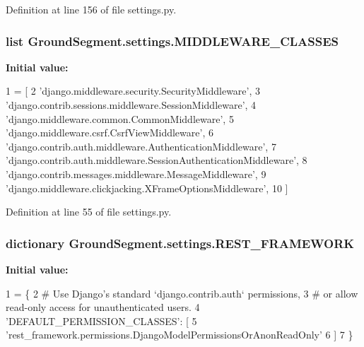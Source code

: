 Definition at line 156 of file settings.\+py.

\hypertarget{namespace_ground_segment_1_1settings_abd392b70ea7895ec177a28651e7616c8}{}
\subsubsection[{M\+I\+D\+D\+L\+E\+W\+A\+R\+E\+\_\+\+C\+L\+A\+S\+S\+E\+S}]{\setlength{\rightskip}{0pt plus 5cm}list Ground\+Segment.\+settings.\+M\+I\+D\+D\+L\+E\+W\+A\+R\+E\+\_\+\+C\+L\+A\+S\+S\+E\+S}\label{namespace_ground_segment_1_1settings_abd392b70ea7895ec177a28651e7616c8}
{\bfseries Initial value\+:}
\begin{DoxyCode}
1 = [
2     \textcolor{stringliteral}{'django.middleware.security.SecurityMiddleware'},
3     \textcolor{stringliteral}{'django.contrib.sessions.middleware.SessionMiddleware'},
4     \textcolor{stringliteral}{'django.middleware.common.CommonMiddleware'},
5     \textcolor{stringliteral}{'django.middleware.csrf.CsrfViewMiddleware'},
6     \textcolor{stringliteral}{'django.contrib.auth.middleware.AuthenticationMiddleware'},
7     \textcolor{stringliteral}{'django.contrib.auth.middleware.SessionAuthenticationMiddleware'},
8     \textcolor{stringliteral}{'django.contrib.messages.middleware.MessageMiddleware'},
9     \textcolor{stringliteral}{'django.middleware.clickjacking.XFrameOptionsMiddleware'},
10 ]
\end{DoxyCode}


Definition at line 55 of file settings.\+py.

\hypertarget{namespace_ground_segment_1_1settings_ab3c36c6cb632b928ebc77a83b13dbda9}{}
\subsubsection[{R\+E\+S\+T\+\_\+\+F\+R\+A\+M\+E\+W\+O\+R\+K}]{\setlength{\rightskip}{0pt plus 5cm}dictionary Ground\+Segment.\+settings.\+R\+E\+S\+T\+\_\+\+F\+R\+A\+M\+E\+W\+O\+R\+K}\label{namespace_ground_segment_1_1settings_ab3c36c6cb632b928ebc77a83b13dbda9}
{\bfseries Initial value\+:}
\begin{DoxyCode}
1 = \{
2     \textcolor{comment}{# Use Django's standard `django.contrib.auth` permissions,}
3     \textcolor{comment}{# or allow read-only access for unauthenticated users.}
4     \textcolor{stringliteral}{'DEFAULT\_PERMISSION\_CLASSES'}: [
5         \textcolor{stringliteral}{'rest\_framework.permissions.DjangoModelPermissionsOrAnonReadOnly'}
6     ]
7 \}
\end{DoxyCode}


